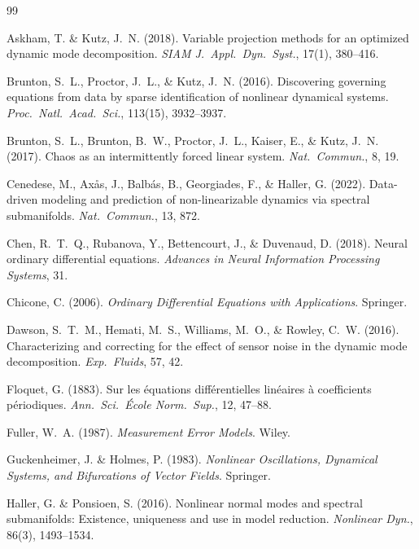 \documentclass[12pt]{article}
\begin{document}
\begin{thebibliography}{99}

Askham, T. \& Kutz, J.~N. (2018).
Variable projection methods for an optimized dynamic mode decomposition.
\textit{SIAM J.\ Appl.\ Dyn.\ Syst.}, 17(1), 380--416.

Brunton, S.~L., Proctor, J.~L., \& Kutz, J.~N. (2016).
Discovering governing equations from data by sparse identification of
nonlinear dynamical systems.
\textit{Proc.\ Natl.\ Acad.\ Sci.}, 113(15), 3932--3937.

Brunton, S.~L., Brunton, B.~W., Proctor, J.~L., Kaiser, E., \& Kutz, J.~N.
(2017). Chaos as an intermittently forced linear system.
\textit{Nat.\ Commun.}, 8, 19.

Cenedese, M., Ax{\aa}s, J., Balb{\'a}s, B., Georgiades, F., \& Haller, G.
(2022). Data-driven modeling and prediction of non-linearizable dynamics
via spectral submanifolds.
\textit{Nat.\ Commun.}, 13, 872.

Chen, R.~T.~Q., Rubanova, Y., Bettencourt, J., \& Duvenaud, D. (2018).
Neural ordinary differential equations.
\textit{Advances in Neural Information Processing Systems}, 31.

Chicone, C. (2006).
\textit{Ordinary Differential Equations with Applications}.
Springer.

Dawson, S.~T.~M., Hemati, M.~S., Williams, M.~O., \& Rowley, C.~W. (2016).
Characterizing and correcting for the effect of sensor noise in the dynamic
mode decomposition.
\textit{Exp.\ Fluids}, 57, 42.

Floquet, G. (1883).
Sur les \'equations diff\'erentielles lin\'eaires \`a coefficients
p\'eriodiques.
\textit{Ann.\ Sci.\ \'Ecole Norm.\ Sup.}, 12, 47--88.

Fuller, W.~A. (1987).
\textit{Measurement Error Models}.
Wiley.

Guckenheimer, J. \& Holmes, P. (1983).
\textit{Nonlinear Oscillations, Dynamical Systems, and Bifurcations of
Vector Fields}.
Springer.

Haller, G. \& Ponsioen, S. (2016).
Nonlinear normal modes and spectral submanifolds: Existence, uniqueness
and use in model reduction.
\textit{Nonlinear Dyn.}, 86(3), 1493--1534.


\end{thebibliography}
\end{document}
